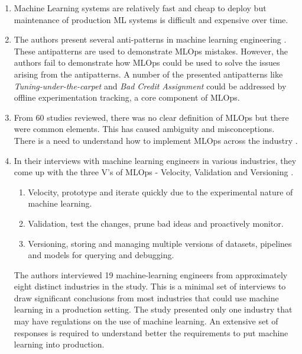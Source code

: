 \documentclass[12pt, a4paper]{article}
\begin{document}
\begin{enumerate}

\item Machine Learning systems are relatively fast and cheap to deploy but maintenance of production ML systems is difficult and expensive over time.  \autocite{sculleyHiddenTechnicalDebt2015}

\item The authors present several anti-patterns in machine learning engineering \autocite{muralidharUsingAntiPatternsAvoid2021}. These antipatterns are used to demonstrate MLOps mistakes. However, the authors fail to demonstrate how MLOps could be used to solve the issues arising from the antipatterns. A number of the presented antipatterns like \textit{Tuning-under-the-carpet} and \textit{Bad Credit Assignment} could be addressed by offline experimentation tracking, a core component of MLOps.

\item From 60 studies reviewed, there was no clear definition of MLOps but there were common elements. This has caused ambiguity and misconceptions. There is a need to understand how to implement MLOps across the industry \autocite{mboweniSystematicReviewMachine2022}. 

\item In their interviews with machine learning engineers in various industries, they come up with the three V's of MLOps - Velocity, Validation and Versioning \autocite{shankarOperationalizingMachineLearning2022}. 
    \begin{enumerate}
        \item Velocity, prototype and iterate quickly due to the experimental nature of machine learning.
        \item Validation, test the changes, prune bad ideas and proactively monitor.
        \item Versioning, storing and managing multiple versions of datasets, pipelines and models for querying and debugging.
    \end{enumerate}
The authors interviewed 19 machine-learning engineers from approximately eight distinct industries in the study. This is a minimal set of interviews to draw significant conclusions from most industries that could use machine learning in a production setting. The study presented only one industry that may have regulations on the use of machine learning. An extensive set of responses is required to understand better the requirements to put machine learning into production.
\end{enumerate}

\printbibliography
\end{document}
